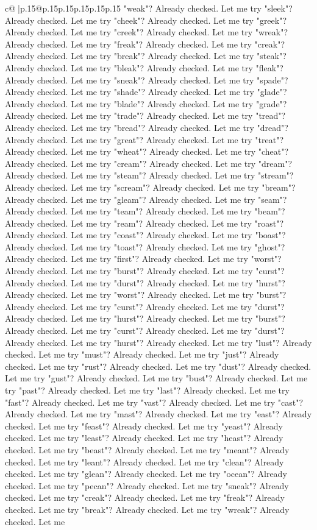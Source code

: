 \documentclass{article}
\begin{document}
{\begin{supertabular}{c@{$\;$}|p{.15\linewidth}@{}p{.15\linewidth}p{.15\linewidth}p{.15\linewidth}p{.15\linewidth}p{.15\linewidth}}
{{{"weak"? Already checked. Let me try "sleek"? Already checked. Let me try "cheek"? Already checked. Let me try "greek"? Already checked. Let me try "creek"? Already checked. Let me try "wreak"? Already checked. Let me try "freak"? Already checked. Let me try "creak"? Already checked. Let me try "break"? Already checked. Let me try "steak"? Already checked. Let me try "bleak"? Already checked. Let me try "fleak"? Already checked. Let me try "sneak"? Already checked. Let me try "spade"? Already checked. Let me try "shade"? Already checked. Let me try "glade"? Already checked. Let me try "blade"? Already checked. Let me try "grade"? Already checked. Let me try "trade"? Already checked. Let me try "tread"? Already checked. Let me try "bread"? Already checked. Let me try "dread"? Already checked. Let me try "great"? Already checked. Let me try "treat"? Already checked. Let me try "wheat"? Already checked. Let me try "cheat"? Already checked. Let me try "cream"? Already checked. Let me try "dream"? Already checked. Let me try "steam"? Already checked. Let me try "stream"? Already checked. Let me try "scream"? Already checked. Let me try "bream"? Already checked. Let me try "gleam"? Already checked. Let me try "seam"? Already checked. Let me try "team"? Already checked. Let me try "beam"? Already checked. Let me try "ream"? Already checked. Let me try "roast"? Already checked. Let me try "coast"? Already checked. Let me try "boast"? Already checked. Let me try "toast"? Already checked. Let me try "ghost"? Already checked. Let me try "first"? Already checked. Let me try "worst"? Already checked. Let me try "burst"? Already checked. Let me try "curst"? Already checked. Let me try "durst"? Already checked. Let me try "hurst"? Already checked. Let me try "worst"? Already checked. Let me try "burst"? Already checked. Let me try "curst"? Already checked. Let me try "durst"? Already checked. Let me try "hurst"? Already checked. Let me try "burst"? Already checked. Let me try "curst"? Already checked. Let me try "durst"? Already checked. Let me try "hurst"? Already checked. Let me try "lust"? Already checked. Let me try "must"? Already checked. Let me try "just"? Already checked. Let me try "rust"? Already checked. Let me try "dust"? Already checked. Let me try "gust"? Already checked. Let me try "bust"? Already checked. Let me try "past"? Already checked. Let me try "last"? Already checked. Let me try "fast"? Already checked. Let me try "vast"? Already checked. Let me try "cast"? Already checked. Let me try "mast"? Already checked. Let me try "east"? Already checked. Let me try "feast"? Already checked. Let me try "yeast"? Already checked. Let me try "least"? Already checked. Let me try "heast"? Already checked. Let me try "beast"? Already checked. Let me try "meant"? Already checked. Let me try "leant"? Already checked. Let me try "clean"? Already checked. Let me try "glean"? Already checked. Let me try "ocean"? Already checked. Let me try "pecan"? Already checked. Let me try "sneak"? Already checked. Let me try "creak"? Already checked. Let me try "freak"? Already checked. Let me try "break"? Already checked. Let me try "wreak"? Already checked. Let me }}}
\end{supertabular}}
\end{document}
